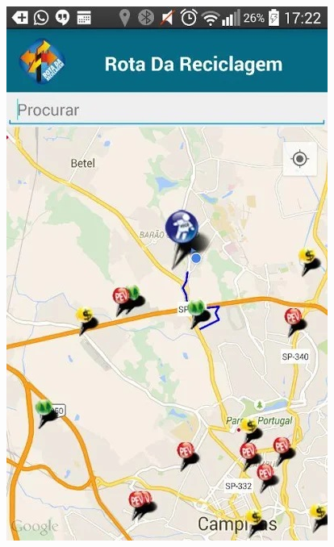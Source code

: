 \documentclass[
	12pt,				%
	openany,			%
	twoside,			%
	a4paper,			%
	english,			%
	french,				%
	spanish,			%
	brazil				%
	]{abntex2}
\begin{document}
\begin{figure}[htb]
\begin{minipage}{0.45\textwidth}
    \includegraphics[scale=0.45]{media/rotaappmap.jpg}
     \label{fig:rota2}
  \end{minipage}
\end{figure}
\end{document}
